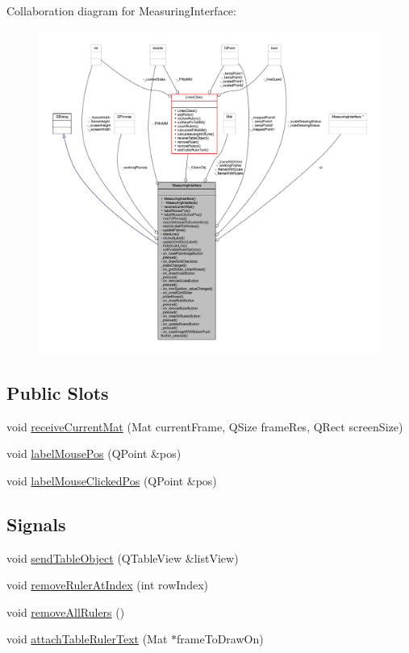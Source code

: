 Collaboration diagram for Measuring\+Interface\+:
\nopagebreak
\begin{figure}[H]
\begin{center}
\leavevmode
\includegraphics[width=350pt]{classMeasuringInterface__coll__graph}
\end{center}
\end{figure}
\subsection*{Public Slots}
\begin{DoxyCompactItemize}
\item 
void \mbox{\hyperlink{classMeasuringInterface_a776a6aa345a738ee46e84c272fd35ce7}{receive\+Current\+Mat}} (Mat current\+Frame, Q\+Size frame\+Res, Q\+Rect screen\+Size)
\item 
void \mbox{\hyperlink{classMeasuringInterface_a3e7eef22037ecb47ad2349205684c6ea}{label\+Mouse\+Pos}} (Q\+Point \&pos)
\item 
void \mbox{\hyperlink{classMeasuringInterface_a02eaf8106ec4eb62d0057c6d447f94c5}{label\+Mouse\+Clicked\+Pos}} (Q\+Point \&pos)
\end{DoxyCompactItemize}
\subsection*{Signals}
\begin{DoxyCompactItemize}
\item 
void \mbox{\hyperlink{classMeasuringInterface_a1c458529cab62e1c2aa540107aa5285a}{send\+Table\+Object}} (Q\+Table\+View \&list\+View)
\item 
void \mbox{\hyperlink{classMeasuringInterface_afe9e0efd285c9239d38d2fa9b9d8ff43}{remove\+Ruler\+At\+Index}} (int row\+Index)
\item 
void \mbox{\hyperlink{classMeasuringInterface_afc88c0d8a1a77e188aa000e2efb1cc80}{remove\+All\+Rulers}} ()
\item 
void \mbox{\hyperlink{classMeasuringInterface_a7a0020d816d48433a2f5035d72b47c68}{attach\+Table\+Ruler\+Text}} (Mat $\ast$frame\+To\+Draw\+On)
\end{DoxyCompactItemize}
